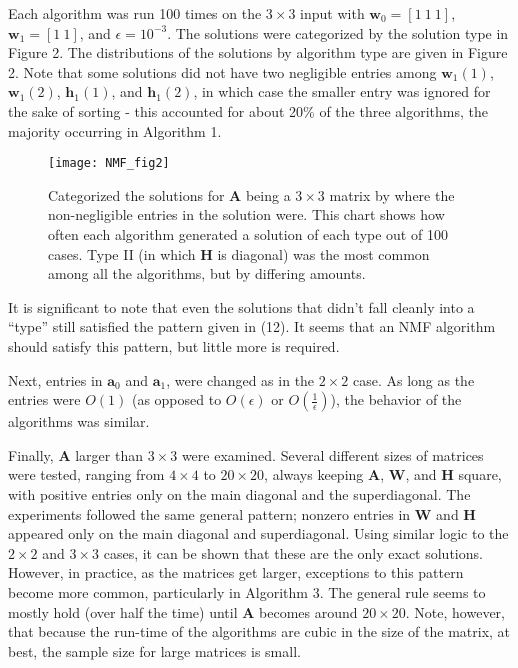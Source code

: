 \documentclass[conference]{IEEEtran}
\begin{document}
Each algorithm was run 100 times on the $ 3 \times 3 $ input with $ \mathbf{w}_0 = [1~1~1] $, $ \mathbf{w}_1 = [1~1] $, and $ \epsilon = 10^{-3} $.  The solutions were categorized by the solution type in Figure 2.  The distributions of the solutions by algorithm type are given in Figure 2.  Note that some solutions did not have two negligible entries among $ \mathbf{w}_1(1) $, $ \mathbf{w}_1(2) $, $ \mathbf{h}_1(1) $, and $ \mathbf{h}_1(2) $, in which case the smaller entry was ignored for the sake of sorting - this accounted for about 20\% of the three algorithms, the majority occurring in Algorithm 1.
\begin{figure}
\begin{center}
\texttt{[image: NMF\_fig2]}
\caption{Categorized the solutions for $ \mathbf{A} $  being a $ 3 \times 3 $ matrix by where the non-negligible entries in the solution were.  This chart shows how often each algorithm generated a solution of each type out of 100 cases.  Type II (in which $ \mathbf{H} $ is diagonal) was the most common among all the algorithms, but by differing amounts.}
\end{center}
\end{figure}
It is significant to note that even the solutions that didn't fall cleanly into a ``type'' still satisfied the pattern given in (12).  It seems that an NMF algorithm should satisfy this pattern, but little more is required.

Next, entries in $ \mathbf{a}_0 $ and $ \mathbf{a}_1 $, were changed as in the $ 2 \times 2 $ case.  As long as the entries were $O(1)$  (as opposed to $ O(\epsilon) $ or $ O(\frac{1}{\epsilon}) $), the behavior of the algorithms was similar.

Finally, $ \mathbf{A} $ larger than $ 3 \times 3 $ were examined.  Several different sizes of matrices were tested, ranging from $ 4 \times 4 $ to $ 20 \times 20 $, always keeping $ \mathbf{A} $, $ \mathbf{W} $, and $ \mathbf{H} $ square, with positive entries only on the main diagonal and the superdiagonal.  The experiments followed the same general pattern; nonzero entries in $ \mathbf{W} $ and $ \mathbf{H} $ appeared only on the main diagonal and superdiagonal.  Using similar logic to the $ 2 \times 2 $ and $ 3 \times 3 $ cases, it can be shown that these are the only exact solutions.  However, in practice, as the matrices get larger, exceptions to this pattern become more common, particularly in Algorithm 3.  The general rule seems to mostly hold (over half the time) until $ \mathbf{A} $ becomes around $ 20 \times 20 $.  Note, however, that because the run-time of the algorithms are cubic in the size of the matrix, at best, the sample size for large matrices is small.
\end{document}
